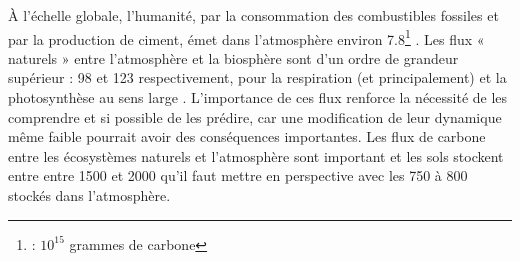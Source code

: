 À l'échelle globale, l'humanité, par la consommation des combustibles fossiles et par la production de ciment, émet dans l'atmosphère environ \SI{7.8}{\pgca}\footnote{\si{\pgc} : $10^{15}$ grammes de carbone} \citep{Ciais2014}.
Les flux « naturels » entre l'atmosphère et la biosphère sont d'un ordre de grandeur supérieur : \num{98} et \SI{123}{\pgca} respectivement, pour la respiration (\coo et \chh principalement) et la photosynthèse au sens large \citep{Bond-Lamberty2010,Beer2010}.
L'importance de ces flux renforce la nécessité de les comprendre et si possible de les prédire, car une modification de leur dynamique même faible pourrait avoir des conséquences importantes.
Les flux de carbone entre les écosystèmes naturels et l'atmosphère sont important et les sols stockent entre entre \num{1500} et \SI{2000}{\pgc} qu'il faut mettre en perspective avec les \num{750} à \SI{800}{\pgc} stockés dans l'atmosphère.


